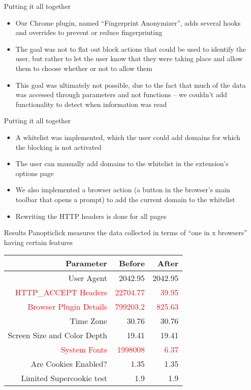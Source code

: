 \begin{frame}[fragile,t]{Putting it all together}
	\begin{itemize}
		\item Our Chrome plugin, named ``Fingerprint Anonymizer'', adds several hooks and overrides to prevent or reduce fingerprinting
		\item The goal was not to flat out block actions that could be used to identify the user, but rather to let the user know that they were taking place and allow them to choose whether or not to allow them
		\item This goal was ultimately not possible, due to the fact that much of the data was accessed through parameters and not functions -- we couldn't add functionality to detect when information was read
	\end{itemize}
\end{frame}

\begin{frame}[fragile,t]{Putting it all together}
	\begin{itemize}
		\item A whitelist was implemented, which the user could add domains for which the blocking is not activated
		\item The user can manually add domains to the whitelist in the extension's options page
		\item We also implemented a browser action (a button in the browser's main toolbar that opens a prompt) to add the current domain to the whitelist
		\item Rewriting the HTTP headers is done for all pages
	\end{itemize}
\end{frame}

\begin{frame}[fragile,t]{Results}
	Panopticlick measures the data collected in terms of ``one in x browsers'' having certain features
	
	\begin{table}[h]
	\centering
	\begin{tabular}{>{\scriptsize}r|>{\scriptsize}r|>{\scriptsize}r}
		\textbf{Parameter} & \textbf{Before} & \textbf{After} \\
		\hline
		User Agent & 2042.95 & 2042.95 \\
		\textcolor{red}{HTTP\_ACCEPT Headers} & \textcolor{red}{22704.77} & \textcolor{red}{39.95} \\
		\textcolor{red}{Browser Plugin Details} & \textcolor{red}{799203.2} & \textcolor{red}{825.63} \\
		Time Zone & 30.76 & 30.76 \\
		Screen Size and Color Depth & 19.41 & 19.41 \\
		\textcolor{red}{System Fonts} & \textcolor{red}{1998008} & \textcolor{red}{6.37} \\
		Are Cookies Enabled? & 1.35 & 1.35 \\
		Limited Supercookie test & 1.9 & 1.9
	\end{tabular}
	\end{table}
\end{frame}

